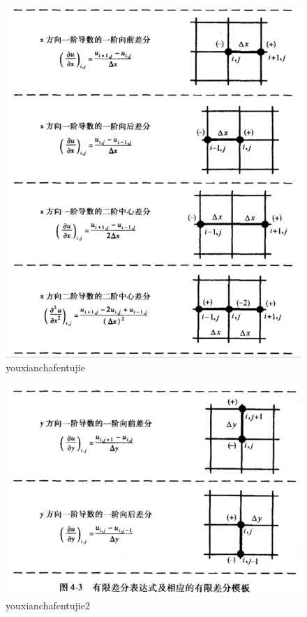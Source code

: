 \documentclass[UTF8]{ctexart}
\begin{document}
\begin{figure}
	\centering
	\includegraphics[width=0.7\linewidth]{figures/youxianchafentujie.png}
	\caption{youxianchafentujie}
	\label{fig:youxianchafentujie}
\end{figure}

\begin{figure}
	\centering
	\includegraphics[width=0.7\linewidth]{figures/youxianchafentujie2.png}
	\caption{youxianchafentujie2}
	\label{fig:youxianchafentujie2}
\end{figure}
\end{document}
